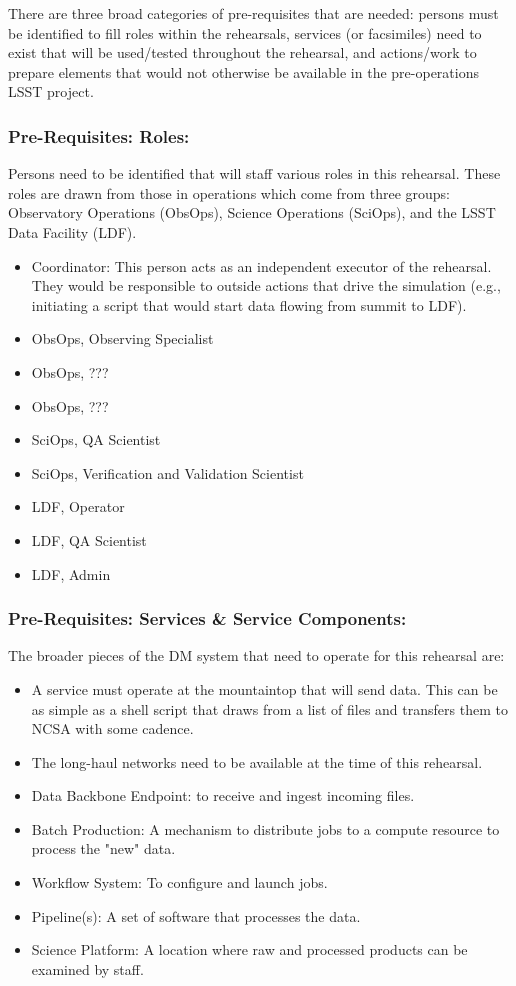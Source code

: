 There are three broad categories of pre-requisites that are needed: persons 
must be identified to fill roles within the rehearsals, services 
(or facsimiles) need to exist that will be used/tested throughout the 
rehearsal, and actions/work to prepare elements that would not otherwise 
be available in the pre-operations LSST project.

 
\subsubsection{Pre-Requisites: Roles:}

Persons need to be identified that will staff various roles in this 
rehearsal.  These roles are drawn from those in operations which come
from three groups: Observatory Operations (ObsOps), Science Operations 
(SciOps), and the LSST Data Facility (LDF).
\begin{itemize}[topsep=-8pt]
\item Coordinator:  This person acts as an independent executor of the 
rehearsal.  They would be responsible to outside actions that drive the 
simulation (e.g., initiating a script that would start data flowing from 
summit to LDF).
\item ObsOps, Observing Specialist
\item ObsOps, ???
\item ObsOps, ???
\item SciOps, QA Scientist
\item SciOps, Verification and Validation Scientist
\item LDF, Operator
\item LDF, QA Scientist
\item LDF, Admin
\end{itemize}

\subsubsection{Pre-Requisites: Services \& Service Components:}

The broader pieces of the DM system that need to operate for this rehearsal are:
\begin{itemize}[topsep=-8pt]
\item A service must operate at the mountaintop that will send data.  This can 
be as simple as a shell script that draws from a list of files and transfers 
them to NCSA with some cadence. 
\item The long-haul networks need to be available at the time of this rehearsal.
\item Data Backbone Endpoint: to receive and ingest incoming files.
\item Batch Production: A mechanism to distribute jobs to a compute resource 
to process the "new" data.
\item Workflow System:  To configure and launch jobs.
\item Pipeline(s): A set of software that processes the data.
\item Science Platform: A location where raw and processed products can be 
examined by staff.
\end{itemize}

